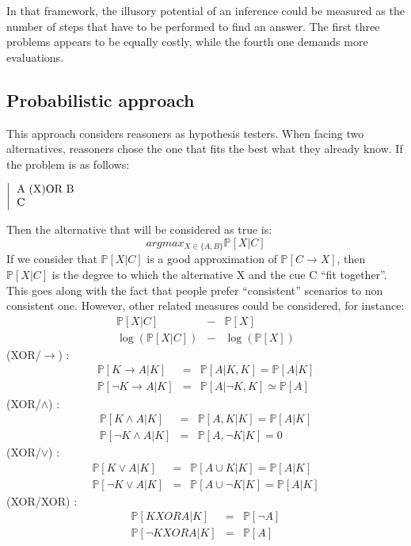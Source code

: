 \documentclass[french]{article}
\begin{document}
In that framework, the illusory potential of an inference could be measured as the number of steps that have to be performed to find an answer. The first three problems appears to be equally costly, while the fourth one demands more evaluations.
\subsection{Probabilistic approach}
This approach considers reasoners as hypothesis testers. When facing two alternatives, reasoners chose the one that fits the best what they already know. If the problem is as follows:
\begin{center}
	$\left |\begin{tabular}{l}
	A (X)OR B\\
	C
\end{tabular}\right.$
\end{center}
Then the alternative that will be considered as true is:
\begin{equation*}
argmax_{X \in \lbrace A, B \rbrace} \mathbb{P}[X|C]
\end{equation*}
If we consider that $\mathbb{P}[X|C]$ is a good approximation of $\mathbb{P}[C\rightarrow X]$, then $\mathbb{P}[X|C]$ is the degree to which the alternative X and the cue C ``fit together''. This goes along with the fact that people prefer ``consistent'' scenarios to non consistent one. However, other related measures could be considered, for instance:
\begin{eqnarray*}
\mathbb{P}[X|C] &-& \mathbb{P}[X]\\
\log(\mathbb{P}[X|C]) &-& \log(\mathbb{P}[X])
\end{eqnarray*}
(XOR/$\rightarrow$) : \\
\begin{eqnarray*}
\mathbb{P}[K \rightarrow A|K] &=& \mathbb{P}[A|K, K] = \mathbb{P}[A|K]\\
\mathbb{P}[\neg K \rightarrow A|K] &=& \mathbb{P}[A|\neg K, K] \simeq \mathbb{P}[A]
\end{eqnarray*}
(XOR/$\wedge$) : \\
\begin{eqnarray*}
\mathbb{P}[K \wedge A|K] &=& \mathbb{P}[A, K|K] = \mathbb{P}[A|K]\\
\mathbb{P}[\neg K \wedge A|K] &=& \mathbb{P}[A, \neg K| K] = 0
\end{eqnarray*}
(XOR/$\vee$) : \\
\begin{eqnarray*}
\mathbb{P}[K \vee A|K] &=& \mathbb{P}[A \cup K|K] = \mathbb{P}[A|K]\\
\mathbb{P}[\neg K \vee A|K] &=& \mathbb{P}[A \cup \neg K| K] = \mathbb{P}[A|K]
\end{eqnarray*}
(XOR/XOR) : \\
\begin{eqnarray*}
\mathbb{P}[K XOR A|K] &=& \mathbb{P}[\neg A]\\
\mathbb{P}[\neg K XOR A|K] &=& \mathbb{P}[A]
\end{eqnarray*}
\end{document}
